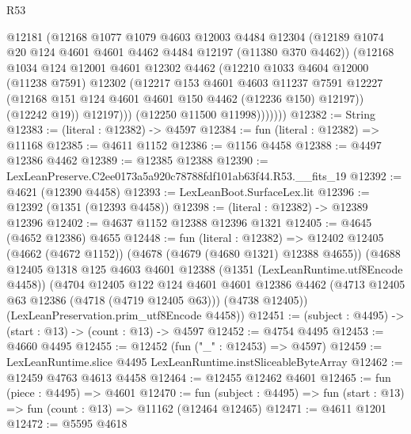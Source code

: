 \begin{lexlean}{R53}
\begin{coremodule}
                  @12181
                  (@12168
                    @1077
                    @1079
                    @4603
                    @12003
                    @4484
                    @12304
                    (@12189 @1074 @20 @124 @4601 @4601 @4462 @4484 @12197 (@11380 @370 @4462))
                    (@12168
                      @1034
                      @124
                      @12001
                      @4601
                      @12302
                      @4462
                      (@12210
                        @1033
                        @4604
                        @12000
                        (@11238 @7591)
                        @12302
                        (@12217
                          @153
                          @4601
                          @4603
                          @11237
                          @7591
                          @12227
                          (@12168 @151 @124 @4601 @4601 @150 @4462 (@12236 @150) @12197))
                        (@12242 @19))
                      @12197)))
                (@12250 @11500 @11998)))))))
@12382 := String
@12383 := (literal : @12382) -> @4597
@12384 := fun (literal : @12382) => @11168
@12385 := @4611 @1152
@12386 := @1156 @4458
@12388 := @4497 @12386 @4462
@12389 := @12385 @12388
@12390 := LexLeanPreserve.C2ee0173a5a920c78788fdf101ab63f44.R53.__fits_19
@12392 := @4621 (@12390 @4458)
@12393 := LexLeanBoot.SurfaceLex.lit
@12396 := @12392 (@1351 (@12393 @4458))
@12398 := (literal : @12382) -> @12389 @12396
@12402 := @4637 @1152 @12388 @12396 @1321
@12405 := @4645 (@4652 @12386) @4655
@12448 := fun (literal : @12382) =>
  @12402
    @12405
    (@4662 (@4672 @1152))
    (@4678 (@4679 (@4680 @1321) @12388 @4655))
    (@4688
      @12405
      @1318
      @125
      @4603
      @4601
      @12388
      (@1351 (LexLeanRuntime.utf8Encode @4458))
      (@4704
        @12405
        @122
        @124
        @4601
        @4601
        @12386
        @4462
        (@4713 @12405 @63 @12386 (@4718 (@4719 @12405 @63)))
        (@4738 @12405))
      (LexLeanPreservation.prim_utf8Encode @4458))
@12451 := (subject : @4495) -> (start : @13) -> (count : @13) -> @4597
@12452 := @4754 @4495
@12453 := @4660 @4495
@12455 := @12452 (fun ("_" : @12453) => @4597)
@12459 := LexLeanRuntime.slice @4495 LexLeanRuntime.instSliceableByteArray
@12462 := @12459 @4763 @4613 @4458
@12464 := @12455 @12462 @4601
@12465 := fun (piece : @4495) => @4601
@12470 := fun (subject : @4495) => fun (start : @13) => fun (count : @13) => @11162 (@12464 @12465)
@12471 := @4611 @1201
@12472 := @5595 @4618

\end{coremodule}
\end{lexlean}
